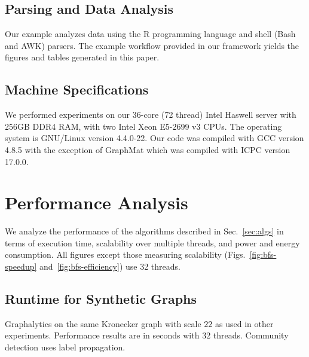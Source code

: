 \documentclass[conference]{IEEEtran}
\begin{document}
\subsection{Parsing and Data Analysis}
Our example analyzes data using the R programming language and shell (Bash and AWK) parsers. The example workflow provided in our framework yields the figures and tables generated in this paper.

\subsection{Machine Specifications}
We performed experiments on our 36-core (72 thread) Intel Haswell server with 256GB DDR4 RAM, with two Intel Xeon E5-2699 v3 CPUs. The operating system is GNU/Linux version 4.4.0-22. Our code was compiled with GCC version 4.8.5 with the exception of GraphMat which was compiled with ICPC version 17.0.0.

\section{Performance Analysis}\label{sec:perf}

We analyze the performance of the algorithms described in Sec.~\ref{sec:algs} in terms of execution time, scalability over multiple threads, and power and energy consumption. All figures except those measuring scalability (Figs.~\ref{fig:bfs-speedup} and~\ref{fig:bfs-efficiency}) use 32 threads.

\subsection{Runtime for Synthetic Graphs}
\begin{table}
	\caption{Graphalytics on the same Kronecker graph with scale $22$ as used in other experiments. Performance results are in seconds with 32 threads. Community detection uses label propagation.}
	\centering
	\label{tab:graphalytics}
\end{table}
\end{document}
